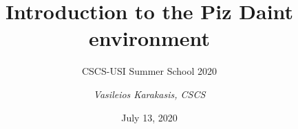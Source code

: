\documentclass[12pt,aspectratio=169]{beamer}
\author{\emph{Vasileios Karakasis, CSCS}}
\title{Introduction to the Piz Daint environment}
\subtitle{CSCS-USI Summer School 2020}
\date{July 13, 2020}
\begin{document}
\cscstitle








\end{document}
